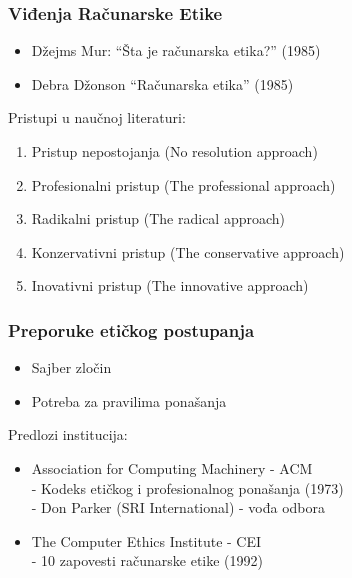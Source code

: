 \documentclass[pdf]{beamer}
\begin{document}
\begin{frame}
\frametitle{Viđenja Računarske Etike}

	\begin{itemize}

	\item Džejms Mur: ``Šta je računarska etika?'' (1985)

	\item Debra Džonson ``Računarska etika'' (1985)
	
	\end{itemize}

	Pristupi u naučnoj literaturi:
	\begin{enumerate}
	\item Pristup nepostojanja (No resolution approach)
	\item Profesionalni pristup (The professional approach)
	\item Radikalni pristup (The radical approach)
	\item Konzervativni pristup (The conservative approach)
	\item Inovativni pristup (The innovative approach)
	\end{enumerate}
	\end{frame}


\begin{frame}
\frametitle{Preporuke etičkog postupanja}

	\begin{itemize}

	\item Sajber zločin
	
	\item Potreba za pravilima ponašanja

	\end{itemize}

	Predlozi institucija:
	\begin{itemize}
		\item Association for Computing Machinery - ACM
		\\- Kodeks etičkog i profesionalnog ponašanja (1973)
		\\ - Don Parker (SRI International) - vođa odbora
		\item The Computer Ethics Institute - CEI
		\\- 10 zapovesti računarske etike (1992)
	\end{itemize}


\end{frame}
\end{document}
